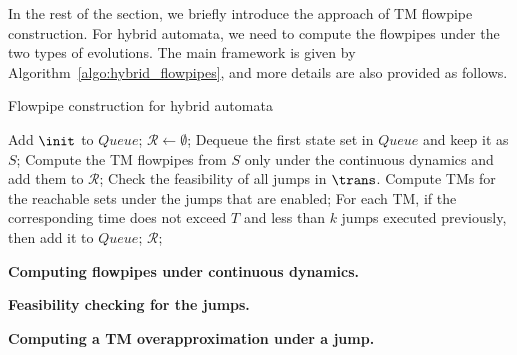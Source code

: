 In the rest of the section, we briefly introduce the approach of TM flowpipe construction. For hybrid automata, we need to compute the flowpipes under the two types of evolutions. The main framework is given by Algorithm~\ref{algo:hybrid_flowpipes}, and more details are also provided as follows.


\begin{algorithm}
 \caption{Flowpipe construction for hybrid automata}\label{algo:hybrid_flowpipes}
 \begin{algorithmic}[1]
  \STATE Add $\init$ to $\textit{Queue}$;
  \STATE $\mathcal{R} \leftarrow \emptyset$;
   \STATE Dequeue the first state set in $\textit{Queue}$ and keep it as $S$;
   \STATE Compute the TM flowpipes from $S$ only under the continuous dynamics and add them to $\mathcal{R}$;
   \STATE Check the feasibility of all jumps in $\trans$.
   \STATE Compute TMs for the reachable sets under the jumps that are enabled;
   \STATE For each TM, if the corresponding time does not exceed $T$ and less than $k$ jumps executed previously, then add it to $\textit{Queue}$;
  \ENDWHILE
  \RETURN $\mathcal{R}$;
 \end{algorithmic}
\end{algorithm}

\noindent\textbf{Computing flowpipes under continuous dynamics.}



\noindent\textbf{Feasibility checking for the jumps.}



\noindent\textbf{Computing a TM overapproximation under a jump.}


